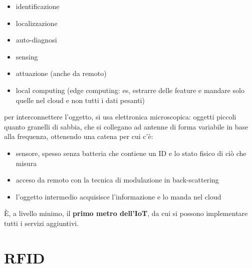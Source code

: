 \documentclass[oneside, 12pt]{extbook}
\begin{document}
\begin{itemize}
	\item identificazione
	\item localizzazione
	\item auto-diagnosi
	\item sensing
	\item attuazione (anche da remoto)
	\item local computing (edge computing: es, estrarre delle feature e mandare solo quelle nel cloud e non tutti i dati pesanti)
\end{itemize}
per interconnettere l'oggetto, si usa elettronica microscopica: oggetti piccoli quanto granelli di sabbia, che si collegano ad antenne di forma variabile in base alla frequenza, ottenendo una catena per cui c'è:
\begin{itemize}
	\item sensore, spesso senza batteria che contiene un ID e lo stato fisico di ciò che misura
	\item acceso da remoto con la tecnica di modulazione in back-scattering
	\item l'oggetto intermedio acquisisce l'informazione e lo manda nel cloud
\end{itemize}
È, a livello minimo, il \textbf{primo metro dell'IoT}, da cui si possono implementare tutti i servizi aggiuntivi.

\section{RFID}
\end{document}
